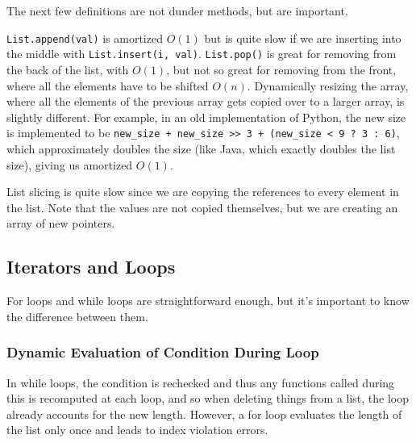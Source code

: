 \documentclass{article}
\begin{document}
    The next few definitions are not dunder methods, but are important. 
    \begin{definition}
      \texttt{List.append(val)} is amortized $O(1)$ but is quite slow if we are inserting into the middle with \texttt{List.insert(i, val)}. 
      \texttt{List.pop()} is great for removing from the back of the list, with $O(1)$, but not so great for removing from the front, where all the elements have to be shifted $O(n)$. 
      Dynamically resizing the array, where all the elements of the previous array gets copied over to a larger array, is slightly different. For example, in an old implementation of Python, the new size is implemented to be \texttt{new\_size + new\_size >> 3 + (new\_size < 9 ? 3 : 6)}, which approximately doubles the size (like Java, which exactly doubles the list size), giving us amortized $O(1)$. 
    \end{definition}

    \begin{definition}[Extend]
      
    \end{definition}

    \begin{definition}[Sort]
      
    \end{definition}

    List slicing is quite slow since we are copying the references to every element in the list. Note that the values are not copied themselves, but we are creating an array of new pointers. 

  \subsection{Iterators and Loops}

      For loops and while loops are straightforward enough, but it's important to know the difference between them. 

    \subsubsection{Dynamic Evaluation of Condition During Loop}

      In while loops, the condition is rechecked and thus any functions called during this is recomputed at each loop, and so when deleting things from a list, the loop already accounts for the new length. However, a for loop evaluates the length of the list only once and leads to index violation errors.  
\end{document}
